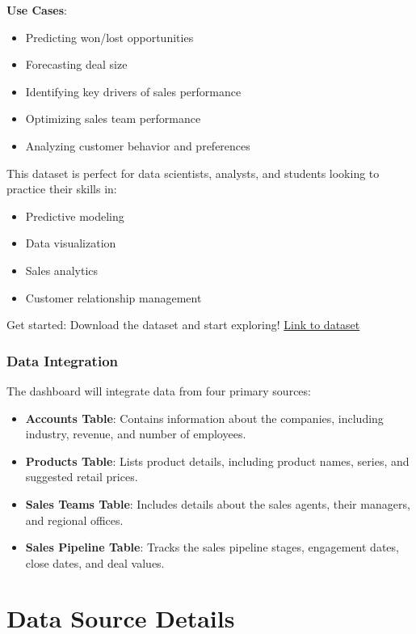 \documentclass{article}
\begin{document}
\textbf{Use Cases}:
\begin{itemize}
    \item Predicting won/lost opportunities
    \item Forecasting deal size
    \item Identifying key drivers of sales performance
    \item Optimizing sales team performance
    \item Analyzing customer behavior and preferences
\end{itemize}

This dataset is perfect for data scientists, analysts, and students looking to practice their skills in:
\begin{itemize}
    \item Predictive modeling
    \item Data visualization
    \item Sales analytics
    \item Customer relationship management
\end{itemize}

Get started: Download the dataset and start exploring! \href{https://www.kaggle.com/datasets/innocentmfa/crm-sales-opportunities}{Link to dataset}
\subsubsection{Data Integration}
The dashboard will integrate data from four primary sources:
\begin{itemize}
    \item \textbf{Accounts Table}: Contains information about the companies, including industry, revenue, and number of employees.
    \item \textbf{Products Table}: Lists product details, including product names, series, and suggested retail prices.
    \item \textbf{Sales Teams Table}: Includes details about the sales agents, their managers, and regional offices.
    \item \textbf{Sales Pipeline Table}: Tracks the sales pipeline stages, engagement dates, close dates, and deal values.
\end{itemize}

\section{Data Source Details}
\end{document}
